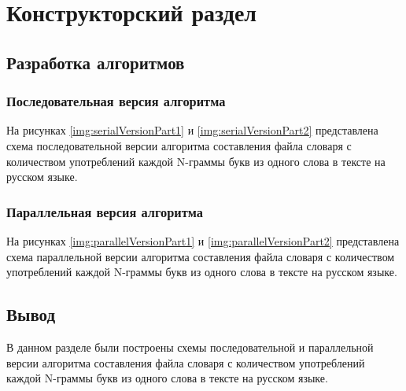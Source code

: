 \chapter{Конструкторский раздел}

\section{Разработка алгоритмов}

\subsection{Последовательная версия алгоритма}

На рисунках \ref{img:serialVersionPart1} и \ref{img:serialVersionPart2} представлена схема последовательной версии алгоритма составления файла словаря с количеством употреблений каждой N-граммы букв из одного слова в тексте на русском языке.

%

\clearpage

\subsection{Параллельная версия алгоритма}


На рисунках \ref{img:parallelVersionPart1} и \ref{img:parallelVersionPart2} представлена схема параллельной версии алгоритма составления файла словаря с количеством употреблений каждой N-граммы букв из одного слова в тексте на русском языке.

%


\clearpage

\section*{Вывод}

В данном разделе были построены схемы последовательной и параллельной версии алгоритма составления файла словаря с количеством употреблений каждой N-граммы букв из одного слова в тексте на русском языке.



